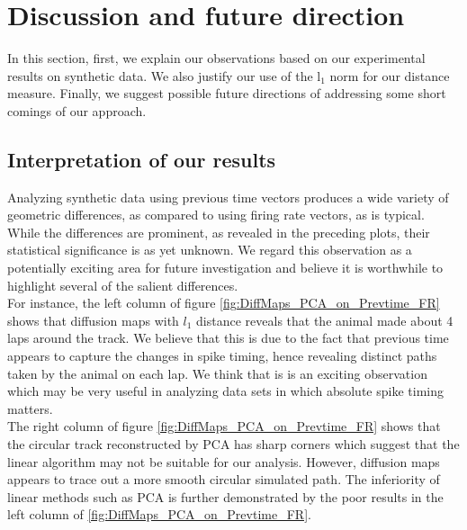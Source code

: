 \section{Discussion and future direction}
In this section, first, we explain our observations based on our experimental
results on synthetic data. We also justify our use of the l$_{1}$ norm for our distance measure. Finally, we suggest possible future directions of addressing some short comings of our approach.


\subsection{Interpretation of our results}
Analyzing synthetic data using previous time vectors produces a wide variety of geometric differences, as compared to  using firing rate vectors, as is typical.
While the differences are prominent, as revealed in the preceding plots, their 
statistical significance is as yet unknown. We regard this observation as a potentially exciting area for future investigation and believe it is worthwhile 
to highlight several of the salient differences.\\


For instance, the left column of figure \ref{fig:DiffMaps_PCA_on_Prevtime_FR} shows that diffusion maps with $l_{1}$ distance reveals that the animal made about 4 laps around the track.
We believe that this is due to the fact that previous time appears to capture the changes in spike timing, hence revealing distinct paths taken by the animal on each lap. We think that is is an exciting observation which may be very useful in analyzing data sets in which absolute spike timing matters.\\


The right column of figure \ref{fig:DiffMaps_PCA_on_Prevtime_FR} shows that the circular track reconstructed by PCA has sharp corners which suggest that the linear algorithm may not be
suitable for our analysis. However, diffusion maps appears to trace out a more smooth circular simulated path. The inferiority of linear methods such as PCA is further demonstrated by the poor results in the left column of \ref{fig:DiffMaps_PCA_on_Prevtime_FR}.\\



